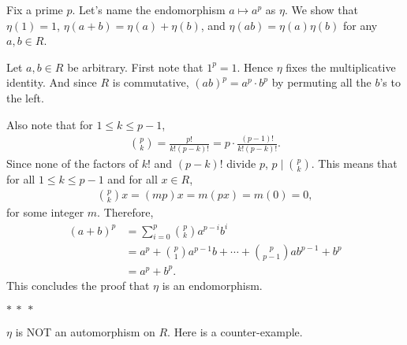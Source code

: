 \documentclass[12pt]{article}
\begin{document}
\begin{fproof}[Jacobson 2.7.2]

\end{fproof}
\newpage

\begin{fproof}[Jacobson 2.7.4]
  Fix a prime \(p\).
  Let's name the endomorphism \(a \mapsto a^{p}\) as \(\eta\).
  We show that \(\eta(1) = 1\), \(\eta(a+b) = \eta(a)+ \eta(b)\), and \(\eta(ab) = \eta(a)\eta(b)\) for any \(a,b \in R\).

  Let \(a,b \in R\) be arbitrary.
  First note that \(1^p = 1\). Hence \(\eta\) fixes the multiplicative identity.
  And since \(R\) is commutative, \((ab)^p = a^p \cdot b^p\) by permuting all the \(b\)'s to the left.

  Also note that for \(1 \leq k \leq p-1\),
  \begin{align*}
    \binom{p}{k} = \frac{p!}{k!(p-k)!} = p \cdot \frac{(p-1)!}{k!(p-k)!}.
  \end{align*}
  Since none of the factors of \(k!\) and \((p-k)!\) divide \(p\), \(p \mid \binom{p}{k}\). This means that for all \(1 \leq k \leq p-1\) and for all \(x \in R\),
  \begin{align*}
    \binom{p}{k}x = (mp)x = m(px) = m(0) = 0,
  \end{align*}
  for some integer \(m\).
  Therefore,
  \begin{align*}
    (a+b)^p &= \sum_{i=0}^{p} \binom{p}{k} a^{p-i}b^{i}\\
    & = a^p + \binom{p}{1}a^{p-1}b + \cdots + \binom{p}{p-1}ab^{p-1} + b^p\\
    & = a^p + b^p.
  \end{align*}
  This concludes the proof that \(\eta\) is an endomorphism.
  \begin{center}
    \(\ast~\ast~\ast\)
  \end{center}
  \(\eta\) is NOT an automorphism on \(R\). Here is a counter-example.

\end{fproof}
\newpage

\begin{fproof}[Jacobson 2.7.9]

\end{fproof}
\newpage

\begin{fproof}[Jacobson 2.7.10]

\end{fproof}
\end{document}
